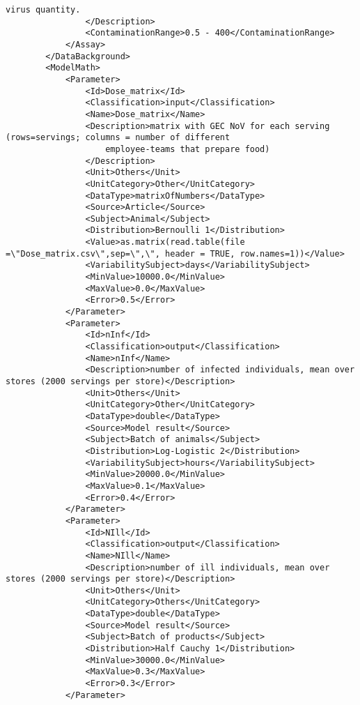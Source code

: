 \begin{lstlisting}[language=RAKIP, caption={Example of DoseResponseModel}]
                    virus quantity.
                </Description>
                <ContaminationRange>0.5 - 400</ContaminationRange>
            </Assay>
        </DataBackground>
        <ModelMath>
            <Parameter>
                <Id>Dose_matrix</Id>
                <Classification>input</Classification>
                <Name>Dose_matrix</Name>
                <Description>matrix with GEC NoV for each serving (rows=servings; columns = number of different
                    employee-teams that prepare food)
                </Description>
                <Unit>Others</Unit>
                <UnitCategory>Other</UnitCategory>
                <DataType>matrixOfNumbers</DataType>
                <Source>Article</Source>
                <Subject>Animal</Subject>
                <Distribution>Bernoulli 1</Distribution>
                <Value>as.matrix(read.table(file =\"Dose_matrix.csv\",sep=\",\", header = TRUE, row.names=1))</Value>
                <VariabilitySubject>days</VariabilitySubject>
                <MinValue>10000.0</MinValue>
                <MaxValue>0.0</MaxValue>
                <Error>0.5</Error>
            </Parameter>
            <Parameter>
                <Id>nInf</Id>
                <Classification>output</Classification>
                <Name>nInf</Name>
                <Description>number of infected individuals, mean over stores (2000 servings per store)</Description>
                <Unit>Others</Unit>
                <UnitCategory>Other</UnitCategory>
                <DataType>double</DataType>
                <Source>Model result</Source>
                <Subject>Batch of animals</Subject>
                <Distribution>Log-Logistic 2</Distribution>
                <VariabilitySubject>hours</VariabilitySubject>
                <MinValue>20000.0</MinValue>
                <MaxValue>0.1</MaxValue>
                <Error>0.4</Error>
            </Parameter>
            <Parameter>
                <Id>NIll</Id>
                <Classification>output</Classification>
                <Name>NIll</Name>
                <Description>number of ill individuals, mean over stores (2000 servings per store)</Description>
                <Unit>Others</Unit>
                <UnitCategory>Others</UnitCategory>
                <DataType>double</DataType>
                <Source>Model result</Source>
                <Subject>Batch of products</Subject>
                <Distribution>Half Cauchy 1</Distribution>
                <MinValue>30000.0</MinValue>
                <MaxValue>0.3</MaxValue>
                <Error>0.3</Error>
            </Parameter>

\end{lstlisting}
